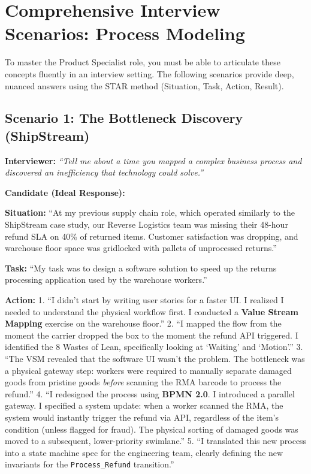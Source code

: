 \documentclass[
  11pt,
  openany,
  oneside]{book}
\begin{document}
\bigskip

\section{Comprehensive Interview Scenarios: Process
Modeling}\label{comprehensive-interview-scenarios-process-modeling}

To master the Product Specialist role, you must be able to articulate
these concepts fluently in an interview setting. The following scenarios
provide deep, nuanced answers using the STAR method (Situation, Task,
Action, Result).

\subsection{Scenario 1: The Bottleneck Discovery
(ShipStream)}\label{scenario-1-the-bottleneck-discovery-shipstream}

\textbf{Interviewer:} \emph{``Tell me about a time you mapped a complex
business process and discovered an inefficiency that technology could
solve.''}

\textbf{Candidate (Ideal Response):}

\textbf{Situation:} ``At my previous supply chain role, which operated
similarly to the ShipStream case study, our Reverse Logistics team was
missing their 48-hour refund SLA on 40\% of returned items. Customer
satisfaction was dropping, and warehouse floor space was gridlocked with
pallets of unprocessed returns.''

\textbf{Task:} ``My task was to design a software solution to speed up
the returns processing application used by the warehouse workers.''

\textbf{Action:} 1. ``I didn't start by writing user stories for a
faster UI. I realized I needed to understand the physical workflow
first. I conducted a \textbf{Value Stream Mapping} exercise on the
warehouse floor.'' 2. ``I mapped the flow from the moment the carrier
dropped the box to the moment the refund API triggered. I identified the
8 Wastes of Lean, specifically looking at `Waiting' and `Motion'.'' 3.
``The VSM revealed that the software UI wasn't the problem. The
bottleneck was a physical gateway step: workers were required to
manually separate damaged goods from pristine goods \emph{before}
scanning the RMA barcode to process the refund.'' 4. ``I redesigned the
process using \textbf{BPMN 2.0}. I introduced a parallel gateway. I
specified a system update: when a worker scanned the RMA, the system
would instantly trigger the refund via API, regardless of the item's
condition (unless flagged for fraud). The physical sorting of damaged
goods was moved to a subsequent, lower-priority swimlane.'' 5. ``I
translated this new process into a state machine spec for the
engineering team, clearly defining the new invariants for the
\texttt{Process\_Refund} transition.''
\end{document}
